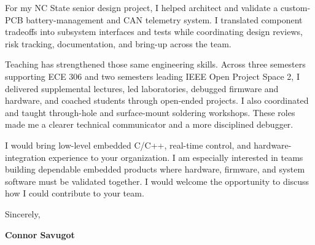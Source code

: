 \documentclass[10pt,letterpaper]{article}
\newcommand{\TargetCompany}{your organization}
\newcommand{\InterestSentence}{I am especially interested in teams building dependable embedded products where hardware, firmware, and system software must be validated together.}
\begin{document}
For my NC State senior design project, I helped architect and validate a custom-PCB battery-management and CAN telemetry system. I translated component tradeoffs into subsystem interfaces and tests while coordinating design reviews, risk tracking, documentation, and bring-up across the team.

Teaching has strengthened those same engineering skills. Across three semesters supporting ECE 306 and two semesters leading IEEE Open Project Space 2, I delivered supplemental lectures, led laboratories, debugged firmware and hardware, and coached students through open-ended projects. I also coordinated and taught through-hole and surface-mount soldering workshops. These roles made me a clearer technical communicator and a more disciplined debugger.

I would bring low-level embedded C/C++, real-time control, and hardware-integration experience to \TargetCompany. \InterestSentence{} I would welcome the opportunity to discuss how I could contribute to your team.

Sincerely,

\textbf{Connor Savugot}
\end{document}
